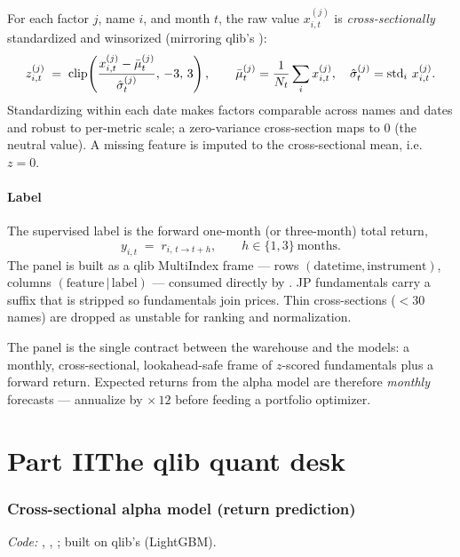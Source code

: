 \documentclass[11pt]{article}
\begin{document}
For each factor $j$, name $i$, and month $t$, the raw value $x^{(j)}_{i,t}$ is
\emph{cross-sectionally} standardized and winsorized (mirroring qlib's
):
\begin{equation}
  z^{(j)}_{i,t} \;=\; \operatorname{clip}\!\left(
    \frac{x^{(j)}_{i,t}-\bar\mu^{(j)}_t}{\hat\sigma^{(j)}_t},\,-3,\,3\right),
  \qquad
  \bar\mu^{(j)}_t=\frac1{N_t}\sum_{i} x^{(j)}_{i,t},\quad
  \hat\sigma^{(j)}_t=\operatorname{std}_i\, x^{(j)}_{i,t}.
\end{equation}
Standardizing within each date makes factors comparable across names and dates
and robust to per-metric scale; a zero-variance cross-section maps to $0$
(the neutral value). A missing feature is imputed to the cross-sectional mean,
i.e.\ $z=0$.

\subsection{Label}
The supervised label is the forward one-month (or three-month) total return,
\begin{equation}
  y_{i,t} \;=\; r_{i,\,t\to t+h}, \qquad h\in\{1,3\}\ \text{months}.
\end{equation}
The panel is built as a qlib MultiIndex frame --- rows $(\text{datetime},
\text{instrument})$, columns $(\text{feature}\,|\,\text{label})$ --- consumed
directly by . JP fundamentals carry a 
suffix that is stripped so fundamentals join prices. Thin cross-sections
($<30$ names) are dropped as unstable for ranking and normalization.

\begin{keybox}[Design]
The panel is the single contract between the warehouse and the models: a monthly,
cross-sectional, lookahead-safe frame of $z$-scored fundamentals plus a forward
return. Expected returns from the alpha model are therefore \emph{monthly}
forecasts --- annualize by $\times\,12$ before feeding a portfolio optimizer.
\end{keybox}

\part*{Part II\quad The qlib quant desk}

\section{Cross-sectional alpha model (return prediction)}
\label{sec:alpha}
\emph{Code:} , ,
; built on qlib's  (LightGBM).
\end{document}
